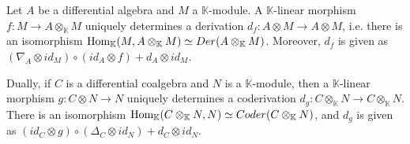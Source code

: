 \documentclass[../thesis.tex]{subfiles}
\begin{document}
            \begin{proposition}\label{prop: free-derivation}
                Let $A$ be a differential algebra and $M$ a $\mathbb{K}$-module. A $\mathbb{K}$-linear morphism $f:M\rightarrow A\otimes_{\mathbb{K}} M$ uniquely determines a derivation $d_f:A\otimes M\rightarrow A\otimes M$, i.e. there is an isomorphism $\tt{Hom}_{\mathbb{K}}(M,A\otimes_{\mathbb{K}}M)\simeq Der(A\otimes_{\mathbb{K}}M)$. Moreover, $d_f$ is given as $(\nabla_A\otimes id_M)\circ (id_A\otimes f) + d_A\otimes id_M$.

                Dually, if $C$ is a differential coalgebra and $N$ is a $\mathbb{K}$-module, then a $\mathbb{K}$-linear morphism $g:C\otimes N\rightarrow N$ uniquely determines a coderivation $d_g:C\otimes_{\mathbb{K}}N\rightarrow C\otimes_{\mathbb{K}}N$. There is an isomorphism $\tt{Hom}_{\mathbb{K}}(C\otimes_{\mathbb{K}}N,N)\simeq Coder(C\otimes_{\mathbb{K}}N)$, and $d_g$ is given as $(id_C\otimes g)\circ (\Delta_C\otimes id_N) + d_C\otimes id_N$.
            \end{proposition}
\end{document}
